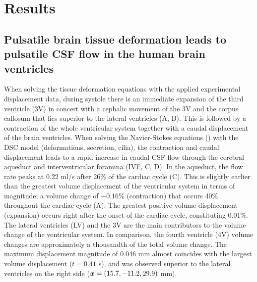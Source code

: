 \documentclass{template}
\begin{document}
\section{Results}
\subsection{Pulsatile brain tissue deformation leads to pulsatile CSF flow in the human brain ventricles}
When solving the tissue deformation equations with the applied
experimental displacement data, during systole there is an immediate expansion
of the third ventricle (3V) in concert with a cephalic movement of the 3V
and the corpus callosum that lies superior to the lateral ventricles
(A, B).
This is followed by a contraction of the whole
ventricular system together with a caudal displacement of
the brain ventricles. When solving the
Navier-Stokes equations () with the
DSC model (deformations, secretion, cilia), the contraction and
caudal displacement leads to a rapid increase in caudal CSF flow
through the cerebral aqueduct and interventricular foramina
(IVF, C, D).
In the aqueduct, the flow rate peaks at
0.22 ml/s after 26\% of the cardiac cycle (C).
This is slightly earlier than the greatest
volume displacement of the ventricular system
in terms of magnitude; a volume change of $-0.16\%$ (contraction)
that occurs 40\% throughout the cardiac cycle (A).
The greatest positive volume displacement (expansion) occurs right after
the onset of the cardiac cycle, constituting 0.01\%.
The lateral ventricles (LV) and the 3V are the main contributors to the volume
change of the ventricular system. In comparison, the fourth ventricle (4V) volume
changes are approximately a thousandth of the total volume change. 
The maximum displacement magnitude of 0.046 mm 
almost coincides with the largest volume displacement ($t=0.41$ s),
and was observed superior to the lateral ventricles on the right side
($\bm{x} = (15.7, -11.2, 29.9)$ mm).
\end{document}
